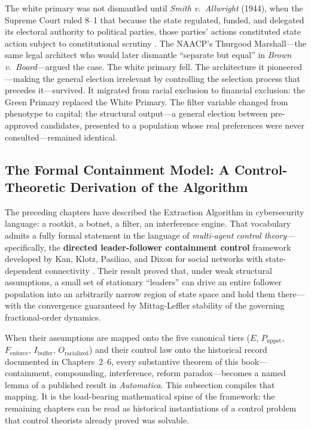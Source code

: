 The white primary was not dismantled until \textit{Smith v.\ Allwright} (1944), when the Supreme Court ruled 8--1 that because the state regulated, funded, and delegated its electoral authority to political parties, those parties' actions constituted state action subject to constitutional scrutiny \cite{smith_v_allwright}. The NAACP's Thurgood Marshall---the same legal architect who would later dismantle ``separate but equal'' in \textit{Brown v.\ Board}---argued the case. The white primary fell. The architecture it pioneered---making the general election irrelevant by controlling the selection process that precedes it---survived. It migrated from racial exclusion to financial exclusion: the Green Primary replaced the White Primary. The filter variable changed from phenotype to capital; the structural output---a general election between pre-approved candidates, presented to a population whose real preferences were never consulted---remained identical.

\subsection{The Formal Containment Model: A Control-Theoretic Derivation of the Algorithm}
\label{sec:formal-containment-model}

The preceding chapters have described the Extraction Algorithm in cybersecurity language: a rootkit, a botnet, a filter, an interference engine. That vocabulary admits a fully formal statement in the language of \textit{multi-agent control theory}---specifically, the \textbf{directed leader-follower containment control} framework developed by Kan, Klotz, Pasiliao, and Dixon for social networks with state-dependent connectivity \cite{kan_containment}. Their result proved that, under weak structural assumptions, a small set of stationary ``leaders'' can drive an entire follower population into an arbitrarily narrow region of state space and hold them there---with the convergence guaranteed by Mittag-Leffler stability of the governing fractional-order dynamics.

When their assumptions are mapped onto the five canonical tiers ($E$, $P_{\text{uppet}}$, $F_{\text{enforce}}$, $I_{\text{buffer}}$, $O_{\text{racialized}}$) and their control law onto the historical record documented in Chapters~2--6, every substantive theorem of this book---containment, compounding, interference, reform paradox---becomes a named lemma of a published result in \textit{Automatica}. This subsection compiles that mapping. It is the load-bearing mathematical spine of the framework: the remaining chapters can be read as historical instantiations of a control problem that control theorists already proved was solvable.

